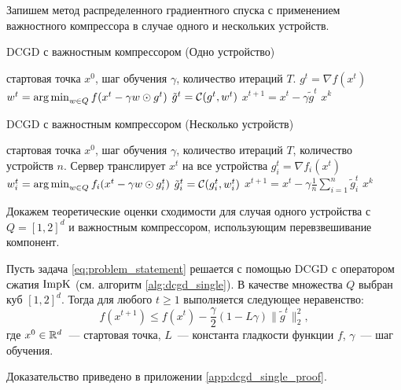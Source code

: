     Запишем метод распределенного градиентного спуска с применением важностного компрессора в случае одного и нескольких устройств.
    \begin{algorithm}[ht]
        \caption{DCGD с важностным компрессором (Одно устройство)}
        \label{alg:dcgd_single}
        \begin{algorithmic}
             стартовая точка $x^0$, шаг обучения $\gamma$, количество итераций $T$.
                \STATE $g^t = \nabla f(x^t)$
                \STATE $w^t = \operatorname*{arg\,min}_{w \in Q} f(x^t - \gamma w \odot g^t)$
                \STATE $\tilde{g}^t = {\cal C}(g^t, w^t)$
                \STATE $x^{t+1} = x^t - \gamma \tilde{g}^t$
            \ENDFOR
             $x^k$
        \end{algorithmic}
    \end{algorithm}

    \begin{algorithm}[ht]
        \caption{DCGD с важностным компрессором (Несколько устройств)}
        \label{alg:dcgd_multi}
        \begin{algorithmic}[1]
             стартовая точка $x^0$, шаг обучения $\gamma$, количество итераций $T$, количество устройств $n$.
                \STATE Сервер транслирует $x^t$ на все устройства
                    \STATE $g_i^t = \nabla f_i(x^t)$
                    \STATE $w_i^t = \operatorname*{arg\,min}_{w \in Q} f_i(x^t - \gamma w \odot g_i^t)$
                    \STATE $\tilde{g}_i^t = {\cal C}(g_i^t, w_i^t)$
                \ENDFOR
                \STATE $x^{t+1} = x^t - \gamma \frac{1}{n} \sum\limits_{i=1}^n \tilde{g}_i^t$
            \ENDFOR
             $x^k$
        \end{algorithmic}
    \end{algorithm}

    Докажем теоретические оценки сходимости для случая одного устройства с $Q = [1, 2]^d$ и важностным компрессором, использующим перевзвешивание компонент.

    \begin{theorem}\label{th:dcgd_single}
        Пусть задача \eqref{eq:problem_statement} решается с помощью DCGD с оператором сжатия $\operatorname{ImpK}$ (см. алгоритм \ref{alg:dcgd_single}). В качестве множества $Q$ выбран куб $[1, 2]^d$. Тогда для любого $t \geq 1$ выполняется следующее неравенство:
        \begin{equation}
            f(x^{t + 1}) \leq f(x^t) - \frac{\gamma}{2} (1 - L \gamma) \|\tilde{g}^t\|_2^2,
        \end{equation}
        где $x^0 \in \mathbb{R}^d$~--- стартовая точка, $L$~--- константа гладкости функции $f$, $\gamma$~--- шаг обучения.
    \end{theorem}
    Доказательство приведено в приложении \ref{app:dcgd_single_proof}.

